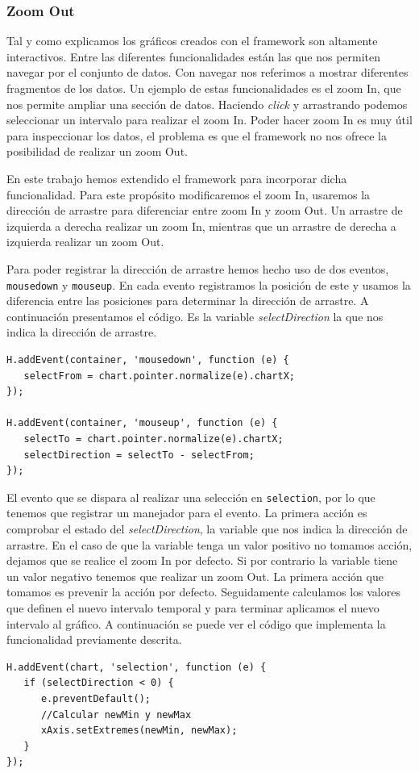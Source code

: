 		\subsubsection{Zoom Out}
			Tal y como explicamos los gráficos creados con el framework son altamente interactivos. Entre las diferentes funcionalidades
			están las que nos permiten navegar por el conjunto de datos. Con navegar nos referimos a mostrar diferentes fragmentos de los
			datos. Un ejemplo de estas funcionalidades es el zoom In, que nos permite ampliar una sección de datos. Haciendo \emph{click}
			y arrastrando podemos seleccionar un intervalo para realizar el zoom In. Poder hacer zoom In es muy útil para inspeccionar los
			datos, el problema es que el framework no nos ofrece la posibilidad de realizar un zoom Out.
			\par
			En este trabajo hemos extendido el framework para incorporar dicha funcionalidad. Para este propósito modificaremos el zoom
			In, usaremos la dirección de arrastre para diferenciar entre zoom In y zoom Out. Un arrastre de izquierda a derecha realizar
			un zoom In, mientras que un arrastre de derecha a izquierda realizar un zoom Out. 
			\par
			Para poder registrar la dirección de arrastre hemos hecho uso de dos eventos, \texttt{mousedown} y \texttt{mouseup}. En cada
			evento registramos la posición de este y usamos la diferencia entre las posiciones para determinar la dirección de arrastre. A
			continuación presentamos el código. Es la variable \emph{selectDirection} la que nos indica la dirección de arrastre.
			\begin{lstlisting}
H.addEvent(container, 'mousedown', function (e) {
   selectFrom = chart.pointer.normalize(e).chartX;
});

H.addEvent(container, 'mouseup', function (e) {
   selectTo = chart.pointer.normalize(e).chartX;
   selectDirection = selectTo - selectFrom;													            
});
			\end{lstlisting}
			\par
			El evento que se dispara al realizar una selección en \texttt{selection}, por lo que tenemos que registrar un manejador para
			el evento. La primera acción es comprobar el estado del \emph{selectDirection}, la variable que nos indica la dirección de
			arrastre. En el caso de que la variable tenga un valor positivo no tomamos acción, dejamos que se realice el zoom In por
			defecto. Si por contrario la variable tiene un valor negativo tenemos que realizar un zoom Out. La primera acción que tomamos
			es prevenir la acción por defecto.  Seguidamente calculamos los valores que definen el nuevo intervalo temporal y para
			terminar aplicamos el nuevo intervalo al gráfico. A continuación se puede ver el código que implementa la funcionalidad
			previamente descrita.
			\begin{lstlisting}
H.addEvent(chart, 'selection', function (e) {
   if (selectDirection < 0) {
      e.preventDefault();
      //Calcular newMin y newMax
      xAxis.setExtremes(newMin, newMax);
   }
});
			\end{lstlisting}
